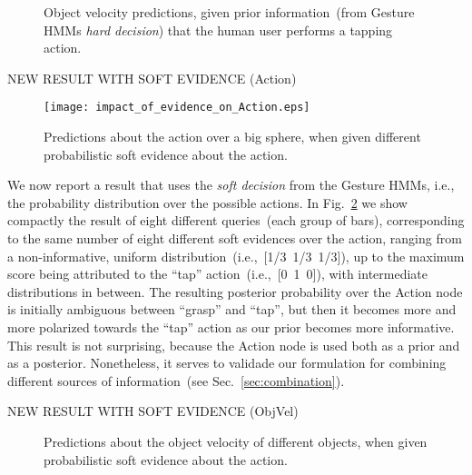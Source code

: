 \begin{figure}
    \centering
     \quad
    \caption{Object velocity predictions, given prior information~(from Gesture \acp{HMM} \emph{hard decision}) that the human user performs a tapping action.}
    \label{fig:effect_pred}
\end{figure}

NEW RESULT WITH SOFT EVIDENCE (Action)

\begin{figure}
\centering
\texttt{[image: impact\_of\_evidence\_on\_Action.eps]}
\caption{Predictions about the action over a big sphere, when given different probabilistic soft evidence about the action.}
\label{fig:impact_of_evidence_on_Action}
\end{figure}

We now report a result that uses the \emph{soft decision} from the Gesture \acp{HMM}, i.e., the probability distribution over the possible actions.
In Fig.~\ref{fig:impact_of_evidence_on_Action} we show compactly the result of eight different queries~(each group of bars), corresponding to the same number of eight different soft evidences over the action, ranging from a non-informative, uniform distribution~(i.e.,~[1/3~1/3~1/3]), up to the maximum score being attributed to the ``tap'' action~(i.e.,~[0~1~0]), with intermediate distributions in between.
The resulting posterior probability over the Action node is initially ambiguous between ``grasp'' and ``tap'', but then it becomes more and more polarized towards the ``tap'' action as our prior becomes more informative.
This result is not surprising, because the Action node is used both as a prior and as a posterior.
Nonetheless, it serves to validade our formulation for combining different sources of information~(see Sec.~\ref{sec:combination}).

NEW RESULT WITH SOFT EVIDENCE (ObjVel)

\begin{figure*}
\centering
{} \quad
%
\caption{Predictions about the object velocity of different objects, when given probabilistic soft evidence about the action.}
\label{fig:impact_of_evidence_on_ObjVel}
\end{figure*}

